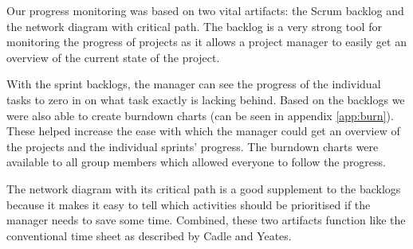 Our progress monitoring was based on two vital artifacts: the Scrum backlog and the network
diagram with critical path. The backlog is a very strong tool for monitoring the progress
of projects as it allows a project manager to easily get an overview of the current state
of the project.

With the sprint backlogs, the manager can see the progress of the individual tasks to zero 
in on what task exactly is lacking behind. Based on the backlogs we were also able to create 
burndown charts (can be seen in appendix \ref{app:burn}). These helped increase the ease 
with which the manager could get an overview of the projects and the individual sprints' progress. 
The burndown charts were available to all group members which allowed everyone to follow the progress.

The network diagram with its critical path is a good supplement to the backlogs because it
makes it easy to tell which activities should be prioritised if the manager needs to save
some time. Combined, these two artifacts function like the conventional time sheet as
described by Cadle and Yeates\cite{caye}.
